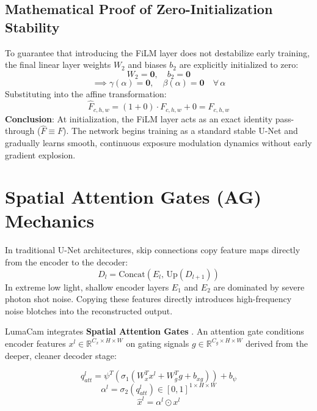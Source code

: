 \subsection{Mathematical Proof of Zero-Initialization Stability}
To guarantee that introducing the FiLM layer does not destabilize early training, the final linear layer weights $W_2$ and biases $b_2$ are explicitly initialized to zero:
\begin{equation}
W_2 = \mathbf{0}, \quad b_2 = \mathbf{0}
\end{equation}
\begin{equation}
\implies \gamma(\alpha) = \mathbf{0}, \quad \beta(\alpha) = \mathbf{0} \quad \forall \, \alpha
\end{equation}
Substituting into the affine transformation:
\begin{equation}
\hat{F}_{c, h, w} = (1 + 0) \cdot F_{c, h, w} + 0 = F_{c, h, w}
\end{equation}
\textbf{Conclusion}: At initialization, the FiLM layer acts as an exact identity pass-through ($\hat{F} \equiv F$). The network begins training as a standard stable U-Net and gradually learns smooth, continuous exposure modulation dynamics without early gradient explosion.

\section{Spatial Attention Gates (AG) Mechanics}
In traditional U-Net architectures, skip connections copy feature maps directly from the encoder to the decoder:
\begin{equation}
D_l = \text{Concat}(E_l, \, \text{Up}(D_{l+1}))
\end{equation}
In extreme low light, shallow encoder layers $E_1$ and $E_2$ are dominated by severe photon shot noise. Copying these features directly introduces high-frequency noise blotches into the reconstructed output.

LumaCam integrates \textbf{Spatial Attention Gates} \cite{oktay2018attention}. An attention gate conditions encoder features $x^l \in \mathbb{R}^{C_x \times H \times W}$ on gating signals $g \in \mathbb{R}^{C_g \times H \times W}$ derived from the deeper, cleaner decoder stage:

\begin{equation}
q_{att}^l = \psi^T \left( \sigma_1 \left( W_x^T x^l + W_g^T g + b_{xg} \right) \right) + b_\psi
\label{eq:ag_linear}
\end{equation}
\begin{equation}
\alpha^l = \sigma_2 \left( q_{att}^l \right) \in [0, 1]^{1 \times H \times W}
\label{eq:ag_sigmoid}
\end{equation}
\begin{equation}
\hat{x}^l = \alpha^l \odot x^l
\label{eq:ag_gating}
\end{equation}

